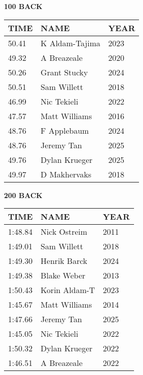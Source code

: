 \begin{table}[H]
\centering
\begin{minipage}[t]{0.48\textwidth}
\centering
\textbf{100 BACK}\\[0.1cm]
\begin{tabular}{@{}p{1.8cm}p{2.8cm}p{1.2cm}@{}}
\hline
    \textbf{TIME} & \textbf{NAME} & \textbf{YEAR} \\
\hline
    50.41 & K Aldam-Tajima & 2023 \\
    49.32 & A Breazeale & 2020 \\
    50.26 & Grant Stucky & 2024 \\
    50.51 & Sam Willett & 2018 \\
    46.99 & Nic Tekieli & 2022 \\
    47.57 & Matt Williams & 2016 \\
    48.76 & F Applebaum & 2024 \\
    48.76 & Jeremy Tan & 2025 \\
    49.76 & Dylan Krueger & 2025 \\
    49.97 & D Makhervaks & 2018 \\
\hline
\end{tabular}
\end{minipage}\hfill
\begin{minipage}[t]{0.48\textwidth}
\centering
\textbf{200 BACK}\\[0.1cm]
\begin{tabular}{@{}p{1.8cm}p{2.8cm}p{1.2cm}@{}}
\hline
    \textbf{TIME} & \textbf{NAME} & \textbf{YEAR} \\
\hline
    1:48.84 & Nick Ostreim & 2011 \\
    1:49.01 & Sam Willett & 2018 \\
    1:49.30 & Henrik Barck & 2024 \\
    1:49.38 & Blake Weber & 2013 \\
    1:50.43 & Korin Aldam-T & 2023 \\
    1:45.67 & Matt Williams & 2014 \\
    1:47.66 & Jeremy Tan & 2025 \\
    1:45.05 & Nic Tekieli & 2022 \\
    1:50.32 & Dylan Krueger & 2022 \\
    1:46.51 & A Breazeale & 2022 \\
\hline
\end{tabular}
\end{minipage}
\end{table}

